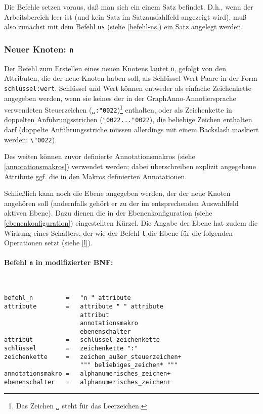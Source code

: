 \documentclass[12pt]{scrartcl}
\newcommand{\quo}{\char"0022}
\begin{document}
Die Befehle setzen voraus, daß man sich ein einem Satz befindet. D.h., wenn der Arbeitsbereich leer ist (und kein Satz im Satzausfahlfeld angezeigt wird), muß also zunächst mit dem Befehl \texttt{ns} (siehe \ref{befehl-ns}) ein Satz angelegt werden.


\subsubsection{Neuer Knoten: \texttt{n}}\label{befehl-n}

Der Befehl zum Erstellen eines neuen Knotens lautet \texttt{n}, gefolgt von den Attributen, die der neue Knoten haben soll, als Schlüssel-Wert-Paare in der Form \texttt{schlüssel:wert}. Schlüssel und Wert können entweder als einfache Zeichenkette angegeben werden, wenn sie keines der in der GraphAnno-Annotiersprache verwendeten Steuerzeichen (\texttt{␣:\quo})\footnote{Das Zeichen \texttt{␣} steht für das Leerzeichen.} enthalten, oder als Zeichenkette in doppelten Anführungsstrichen (\texttt{\quo...\quo}), die beliebige Zeichen enthalten darf (doppelte Anführungsstriche müssen allerdings mit einem Backslash maskiert werden: \texttt{\textbackslash\quo}).

Des weiten können zuvor definierte Annotationsmakros (siehe \ref{annotationsmakros}) verwendet werden; dabei überschreiben explizit angegebene Attribute ggf. die in den Makros definierten Annotationen.

Schließlich kann noch die Ebene angegeben werden, der der neue Knoten angehören soll (andernfalls gehört er zu der im entsprechenden Auswahlfeld aktiven Ebene). Dazu dienen die in der Ebenenkonfiguration (siehe \ref{ebenenkonfiguration}) eingestellten Kürzel. Die Angabe der Ebene hat zudem die Wirkung eines Schalters, der wie der Befehl \texttt{l} die Ebene für die folgenden Operationen setzt (siehe \ref{l}).

\paragraph*{Befehl \texttt{n} in modifizierter BNF:}
~
\begin{framed}
\begin{lstlisting}
befehl_n         =   "n " attribute
attribute        =   attribute " " attribute
                     attribut
                     annotationsmakro
                     ebenenschalter
attribut         =   schlüssel zeichenkette
schlüssel        =   zeichenkette ":"
zeichenkette     =   zeichen_außer_steuerzeichen+
                     """ beliebiges_zeichen* """
annotationsmakro =   alphanumerisches_zeichen+
ebenenschalter   =   alphanumerisches_zeichen+
\end{lstlisting}
\end{framed}
\end{document}
